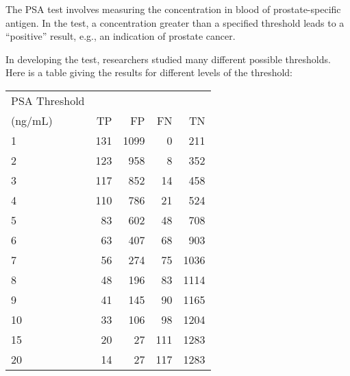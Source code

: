  
The PSA test involves measuring the concentration in blood of prostate-specific antigen.  In the test, a concentration greater than a specified threshold leads to a ``positive'' result, e.g., an indication of prostate cancer.

In developing the test, researchers studied many different possible thresholds.  Here is a table giving the results for different levels of the threshold:

\begin{center}
\begin{tabular}{lrrrr}
PSA Threshold & & & & \\
(ng/mL) & TP & FP & FN & TN\\\hline
1  & 131 & 1099 & 0 & 211\\
2  & 123 &  958 & 8 & 352\\
3  & 117 &  852 & 14 & 458\\
4  & 110 & 786 & 21 & 524\\
5  &  83 & 602 & 48 & 708\\
6  &  63 & 407 & 68 & 903\\
7  &  56 & 274 & 75 & 1036\\
8  &  48 & 196 & 83 & 1114\\
9  &  41 & 145 & 90 & 1165\\
10&  33 & 106 & 98 & 1204\\
15& 20 & 27 & 111 & 1283\\
20& 14 & 27 & 117 & 1283\\ 
\end{tabular}
\end{center}

